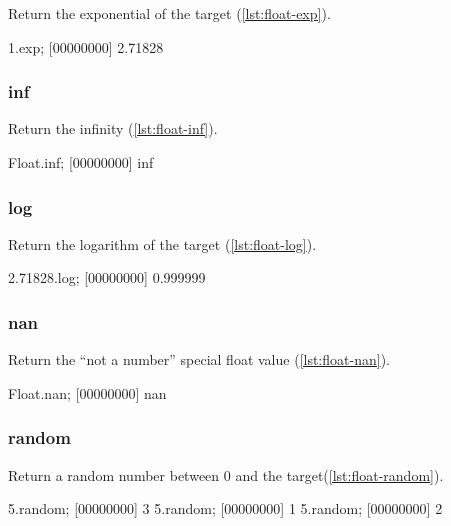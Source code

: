 Return the exponential of the target (\autoref{lst:float-exp}).

\begin{urbiscript}[caption=Float.exp, label=lst:float-exp,
  float=\floatposh]
1.exp;
[00000000] 2.71828
\end{urbiscript}

\subsubsection{inf}

Return the infinity (\autoref{lst:float-inf}).

\begin{urbiscript}[caption=Float.inf, label=lst:float-inf,
  float=\floatposh]
Float.inf;
[00000000] inf
\end{urbiscript}

\subsubsection{log}

Return the logarithm of the target (\autoref{lst:float-log}).

\begin{urbiscript}[caption=Float.log, label=lst:float-log,
  float=\floatposh]
2.71828.log;
[00000000] 0.999999
\end{urbiscript}

\subsubsection{nan}

Return the ``not a number'' special float value (\autoref{lst:float-nan}).

\begin{urbiscript}[caption=Float.nan, label=lst:float-nan,
  float=\floatposh]
Float.nan;
[00000000] nan
\end{urbiscript}

\subsubsection{random}

Return a random number between 0 and the target(\autoref{lst:float-random}).

\begin{urbiscript}[caption=Float.random, label=lst:float-random,
  float=\floatposh]
5.random;
[00000000] 3
5.random;
[00000000] 1
5.random;
[00000000] 2
\end{urbiscript}

